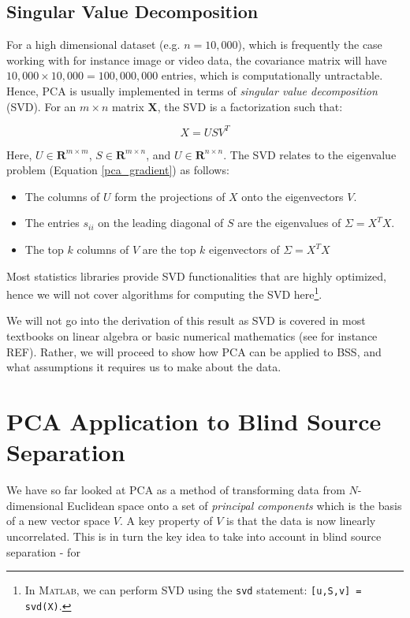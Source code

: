 \documentclass[11pt, oneside, a4paper]{report}
\begin{document}
\subsection{Singular Value Decomposition}

For a high dimensional dataset (e.g. $n = 10,000$), which is
frequently the case working with for instance image or video data, the
covariance matrix will have $10,000\times 10,000 = 100,000,000$
entries, which is computationally untractable. Hence, PCA is usually
implemented in terms of \emph{singular value decomposition} (SVD). For
an $m\times n$ matrix $\boldsymbol{X}$, the SVD is a factorization
such that:


\begin{equation}
  X = US V^{T}
\end{equation}


Here, $U \in \mathbf{R}^{m\times m}$, $S \in \mathbf{R}^{m\times n}$,
and $U \in \mathbf{R}^{n\times n}$. The SVD relates to the eigenvalue
problem (Equation \ref{pca_gradient}) as follows:


\begin{itemize}
\item The columns of $U$ form the projections of $X$ onto the
  eigenvectors $V$.
  \item The entries $s_{ii}$ on the leading diagonal of $S$ are the
    eigenvalues of $\Sigma = X^TX$.
  \item The top $k$ columns of $V$ are the top $k$ eigenvectors of
    $\Sigma = X^T X$
\end{itemize}


Most statistics libraries provide SVD functionalities that are highly
optimized, hence we will not cover algorithms for computing the SVD
here\footnote{In \textsc{Matlab}, we can perform SVD using the
  \texttt{svd}
statement: \texttt{[u,S,v] = svd(X)}.}.


We will not go into the derivation of this result as SVD is covered
in most textbooks on linear algebra or basic numerical
mathematics (see for instance REF). Rather, we will proceed to show how PCA can be applied to
BSS, and what assumptions it requires us to make about the data.



\section{PCA Application to Blind Source Separation}\label{pca_bss}

We have so far looked at PCA as a method of transforming data from
$N$-dimensional Euclidean space onto a set of \emph{principal components}
which is the basis of a new vector space $V$. A key property of $V$ is
that the data is now linearly uncorrelated. This is in turn the key
idea to take into account in blind source separation - for 
\end{document}
